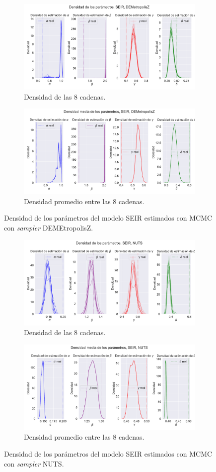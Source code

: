 \begin{figure}[h]
    \centering
    \begin{subfigure}[b]{\linewidth}
        \centering
        \includegraphics[width=0.55\linewidth]{img/content/chapter4/DEMetropolis_seir_params_density.pdf}
        \caption{Densidad de las 8 cadenas.}
    \end{subfigure}
     \begin{subfigure}[b]{\linewidth}
        \centering
        \includegraphics[width=0.55\linewidth]{img/content/chapter4/DEMetropolis_seir_params_density_mean.pdf}
        \caption{Densidad promedio entre las 8 cadenas.}
    \end{subfigure}
    \caption{Densidad de los parámetros del modelo SEIR estimados con MCMC con \textit{sampler} DEMEtropolisZ.}
\end{figure}

\begin{figure}[h]
    \centering
    \begin{subfigure}[b]{\linewidth}
        \centering
        \includegraphics[width=0.55\linewidth]{img/content/chapter4/NUTS_seir_params_density.pdf}
        \caption{Densidad de las 8 cadenas.}
    \end{subfigure}
     \begin{subfigure}[b]{\linewidth}
        \centering
        \includegraphics[width=0.55\linewidth]{img/content/chapter4/NUTS_seir_params_density_mean.pdf}
        \caption{Densidad promedio entre las 8 cadenas.}
    \end{subfigure}
    \caption{Densidad de los parámetros del modelo SEIR estimados con MCMC con \textit{sampler} NUTS.}
\end{figure}

